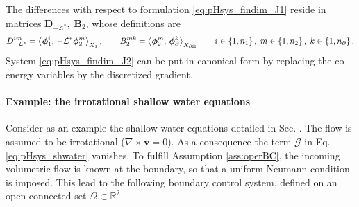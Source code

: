 The differences with respect to formulation \eqref{eq:pHsys_findim_J1} reside in matrices $\mathbf{D}_{-\mathcal{L}^*}, \; \mathbf{B}_2$, whose definitions are
\begin{equation}
{D}_{-\mathcal{L}^*}^{im} = \inner[X_1]{\bm\phi_1^i}{\mathcal{-L^*}\bm\phi_2^m}, \qquad B_2^{mk} = \inner[X_{\partial\Omega}]{\bm\phi_2^m}{\bm\phi_{\partial}^k} \qquad i \in \left\{1, n_1\right\}, \; m \in \left\{1, n_2\right\},\; k \in \left\{1, n_\partial \right\}.
\end{equation}
System \eqref{eq:pHsys_findim_J2} can be put in canonical form by replacing the co-energy variables by the discretized gradient.

\paragraph{Example: the irrotational shallow water equations}
Consider as an example the shallow water equations detailed in Sec. .  The flow is assumed to be irrotational ($\nabla \times \bm{v} = 0$). As a consequence the term $\bm{\mathcal{G}}$ in Eq. \eqref{eq:pHsys_shwater} vanishes.
To fulfill Assumption \ref{ass:operBC}, the incoming volumetric flow is known at the boundary, so that a uniform Neumann condition is imposed. This lead to the following boundary control system, defined on an open connected set $\Omega \subset \mathbb{R}^2$
